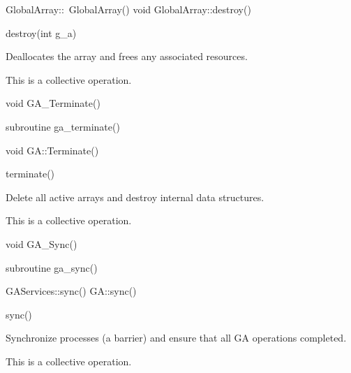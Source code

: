 \documentclass[12pt]{article}
\begin{document}
\begin{cxxapi}
GlobalArray::~GlobalArray()
void GlobalArray::destroy()
\end{cxxapi}

\begin{pyapi}
destroy(int g_a)
\end{pyapi}

\begin{desc}

Deallocates the array and frees any associated resources.

This is a collective operation.

\end{desc}


\begin{capi}
void GA_Terminate()
\end{capi}

\begin{fapi}
subroutine ga_terminate()
\end{fapi}

\begin{cxxapi}
void GA::Terminate()
\end{cxxapi}

\begin{pyapi}
terminate()
\end{pyapi}

\begin{desc}

Delete all active arrays and destroy internal data structures.

This is a collective operation.

\end{desc}


\begin{capi}
void GA_Sync()
\end{capi}

\begin{fapi}
subroutine ga_sync()
\end{fapi}

\begin{cxxapi}
GAServices::sync()
GA::sync()
\end{cxxapi}

\begin{pyapi}
sync()
\end{pyapi}

\begin{desc}

Synchronize processes (a barrier) and ensure that all GA operations completed.

This is a collective operation.

\end{desc}
\end{document}

